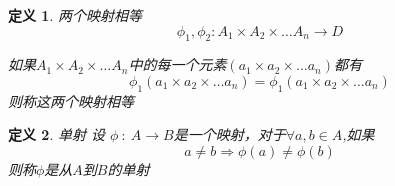 \documentclass[a4paper]{ctexart}
\newtheorem{definition}{定义}[subsection]
\begin{document}
	\begin{definition}
		两个映射相等
		\[\phi_1,\phi_2{:}A_1\times A_2\times \dots A_n \to D\]
		
		如果$A_1\times A_2\times \dots A_n$中的每一个元素$(a_1\times a_2\times \dots a_n)$都有\[\phi_1(a_1\times a_2\times \dots a_n)=\phi_1(a_1\times a_2\times \dots a_n)\]
		则称这两个映射相等
	\end{definition}

	\begin{definition}单射
	设 $ \phi{\ :\  }  A \to B$是一个映射，对于$\forall a,b\in A$,如果 \[a\neq b \Rightarrow \phi(a)\neq \phi(b)\]则称$\phi$是从$ A $到$ B $的单射
	\end{definition}


\end{document}
